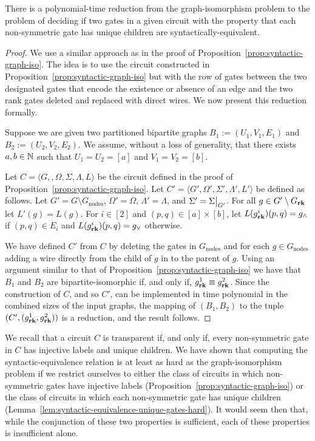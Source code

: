 \documentclass[../paper.tex]{subfiles}
\begin{document}
\begin{lem}
  There is a polynomial-time reduction from the graph-isomorphism problem to the
  problem of deciding if two gates in a given circuit with the property that
  each non-symmetric gate has unique children are syntactically-equivalent.
  \label{lem:syntactic-equivalence-unique-gates-hard}
\end{lem}
\begin{proof}
  We use a similar approach as in the proof of
  Proposition~\ref{prop:syntactic-graph-iso}. The idea is to use the circuit
  constructed in Proposition~\ref{prop:syntactic-graph-iso} but with the row of
  gates between the two designated gates that encode the existence or absence of
  an edge and the two rank gates deleted and replaced with direct wires. We now
  present this reduction formally.
  
  Suppose we are given two partitioned bipartite graphs $B_1 := (U_1, V_1, E_1)$
  and $B_2 := (U_2, V_2, E_2)$. We assume, without a loss of generality, that
  there exists $a, b \in \mathbb{N}$ such that $U_1 = U_2 = [a]$ and $V_1 = V_2 =
  [b]$.

  Let $C = \langle G, , \Omega, \Sigma, \Lambda, L \rangle$ be the circuit
  defined in the proof of Proposition~\ref{prop:syntactic-graph-iso}. Let $C' =
  \langle G', \Omega', \Sigma', \Lambda', L'\rangle$ be defined as follows. Let
  $G' = G \setminus G_{\text{nodes}}$, $\Omega' = \Omega$, $\Lambda' = \Lambda$,
  and $\Sigma' = \restr{\Sigma}{G'}$. For all $g \in G' \setminus G_{\text{\textbf{rk}}}$ let
  $L'(g) = L(g)$. For $i \in [2]$ and $(p,q) \in [a] \times [b]$, let
  $L(g^i_{\text{\textbf{rk}}})(p,q) = g_{\land}$ if $(p,q) \in E_i$ and $L(g^i_{\text{\textbf{rk}}})(p,q)
  = g_{\lor}$ otherwise.

  We have defined $C'$ from $C$ by deleting the gates in $G_{\text{nodes}}$ and
  for each $g \in G_{\text{nodes}}$ adding a wire directly from the child of $g$
  in to the parent of $g$. Using an argument similar to that of
  Proposition~\ref{prop:syntactic-graph-iso} we have that $B_1$ and $B_2$ are
  bipartite-isomorphic if, and only if, $g^1_{\text{\textbf{rk}}} \equiv g^2_{\text{\textbf{rk}}}$. Since
  the construction of $C$, and so $C'$, can be implemented in time polynomial in
  the combined sizes of the input graphs, the mapping of $(B_1, B_2)$ to the
  tuple $(C', (g^1_{\text{\textbf{rk}}}, g^2_{\text{\textbf{rk}}}))$ is a reduction, and the result
  follows.
\end{proof}

We recall that a circuit $C$ is transparent if, and only if, every non-symmetric
gate in $C$ has injective labels and unique children. We have shown that
computing the syntactic-equivalence relation is at least as hard as the
graph-isomorphism problem if we restrict ourselves to either the class of
circuits in which non-symmetric gates have injective labels
(Proposition~\ref{prop:syntactic-graph-iso}) or the class of circuits in which
each non-symmetric gate has unique children
(Lemma~\ref{lem:syntactic-equivalence-unique-gates-hard}). It would seem then
that, while the conjunction of these two properties is sufficient, each of these
properties is insufficient alone.
\end{document}

